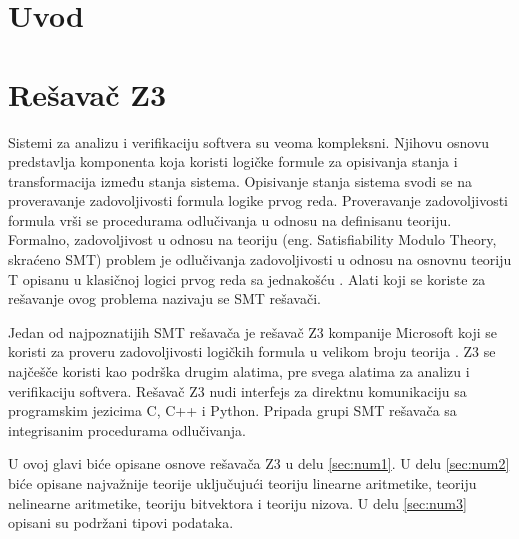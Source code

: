 \documentclass[12pt,oneside]{memoir}
\begin{document}
\frontmatter
\naslovna
\komisija
\apstrakt
\tableofcontents*

\mainmatter

\chapter{Uvod}


\chapter{Rešavač Z3}
\label{chp:razrada}

Sistemi za analizu i verifikaciju softvera su veoma kompleksni. Njihovu osnovu predstavlja komponenta koja koristi logičke formule za opisivanja stanja i transformacija između stanja sistema. Opisivanje stanja sistema svodi se na proveravanje zadovoljivosti formula logike prvog reda. 
Proveravanje zadovoljivosti formula vrši se procedurama odlučivanja u odnosu na definisanu teoriju. Formalno, zadovoljivost u odnosu na teoriju (eng. Satisfiability Modulo Theory, skraćeno SMT) problem je odlučivanja zadovoljivosti u odnosu na osnovnu teoriju T opisanu u klasičnoj logici prvog reda sa jednakošću \cite{Barrett}. Alati koji se koriste za rešavanje ovog problema nazivaju se SMT rešavači. 
\par

Jedan od najpoznatijih SMT rešavača je rešavač Z3 kompanije Microsoft koji se koristi za proveru zadovoljivosti logičkih formula u velikom broju teorija \cite{EfficientSMTSolver}. Z3 se najčešče koristi kao podrška drugim alatima, pre svega alatima za analizu i verifikaciju softvera. Rešavač Z3 nudi interfejs za direktnu komunikaciju sa programskim jezicima C, C++ i Python. Pripada grupi SMT rešavača sa integrisanim procedurama odlučivanja.
\par
U ovoj glavi biće opisane osnove rešavača Z3 u delu \ref{sec:num1}. U delu \ref{sec:num2} biće opisane najvažnije teorije uključujući teoriju linearne aritmetike, teoriju nelinearne aritmetike, teoriju bitvektora i teoriju nizova. U delu \ref{sec:num3} opisani su podržani tipovi podataka.  
\end{document}
